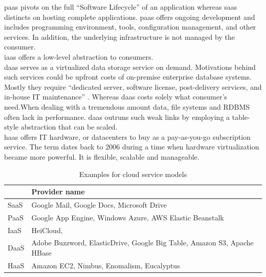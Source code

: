 \ac{paas} pivots on the full \enquote{Software Lifecycle} of an application whereas \ac{saas} distincts on hosting complete applications. \ac{paas} offers ongoing development and includes programming environment, tools, configuration management, and other services. In addition, the underlying infrastructure is not managed by the consumer.\\

\ac{iaas} offers a low-level abstraction to consumers.\\

\ac{daas} serves as a virtualized data storage service on demand. Motivations behind such services could be upfront costs of on-premise enterprise database systems.\cite{Dillon2010} Mostly they require \enquote{dedicated server, software license, post-delivery services, and in-house IT maintenance} \cite{Dillon2010}. Whereas \ac{daas} costs solely what consumer's need.When dealing with a tremendous amount data, file systems and RDBMS often lack in performance. \ac{daas} outruns such weak links by employing a table-style abstraction that can be scaled. \\

\ac{haas} offers IT hardware, or datacenters to buy as a pay-as-you-go subscription service. The term dates back to 2006 during a time when hardware virtualization became more powerful. It is flexible, scalable and manageable. \cite{Wang2010}\\

\begin{table}[h]
    \label{tab:example-service-models}
    \centering
    \caption{Examples for cloud service models}
    \begin{tabular}{|l|l|}
        \hline
             & Provider name                                                           \\ \hline
        SaaS & Google Mail, Google Docs, Microsoft Drive                               \\ \hline
        PaaS & Google App Engine, Windows Azure, AWS Elastic Beanstalk                 \\ \hline
        IaaS & HeiCloud,                                                               \\ \hline
        DaaS & Adobe Buzzword, ElasticDrive, Google Big Table, Amazon S3, Apache HBase \\ \hline
        HaaS & Amazon EC2, Nimbus, Enomalism, Eucalyptus                               \\ \hline
    \end{tabular}
\end{table}

